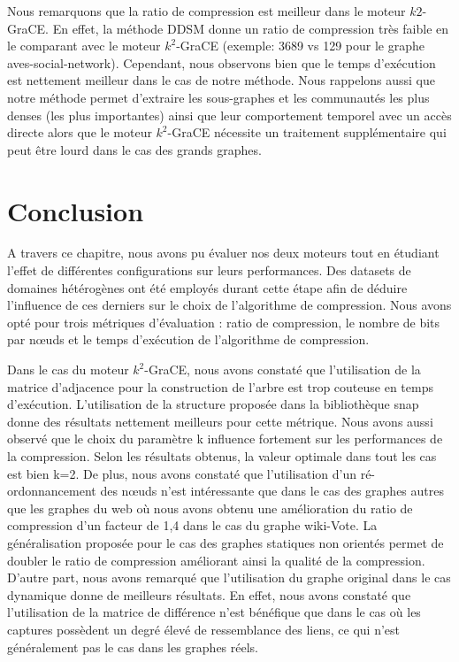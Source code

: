	
	Nous remarquons que la ratio de compression est meilleur dans le moteur $k2$-GraCE. En effet, la méthode DDSM donne un ratio de compression très faible en le comparant avec le moteur $k^2$-GraCE (exemple: 3689 vs 129 pour le graphe aves-social-network). Cependant, nous observons bien que le temps d'exécution est nettement meilleur dans le cas de notre méthode. Nous rappelons aussi que notre méthode permet d'extraire les sous-graphes et les communautés les plus denses (les plus importantes) ainsi que leur comportement temporel avec un accès directe alors que le moteur $k^2$-GraCE nécessite un traitement supplémentaire qui peut être lourd dans le cas des grands graphes. 
	
	 
	
	\section{Conclusion}
	
	A travers ce chapitre,  nous avons pu évaluer nos deux moteurs tout en étudiant l'effet de différentes configurations sur leurs performances. Des datasets de domaines hétérogènes ont été employés durant cette étape afin de déduire l'influence de ces derniers sur le choix de l'algorithme de compression. Nous avons opté pour trois métriques d'évaluation : ratio de compression, le nombre de bits par nœuds et le temps d'exécution de l'algorithme de compression.
	
	Dans le cas du moteur $k^2$-GraCE, nous avons constaté que l'utilisation de la matrice d'adjacence pour la construction de l'arbre est trop couteuse en temps d'exécution. L'utilisation de la structure proposée dans la bibliothèque \gls{snap} donne des résultats nettement meilleurs pour cette métrique. Nous avons aussi observé que le choix du paramètre k influence fortement sur les performances de la compression. Selon les résultats obtenus, la valeur optimale dans tout les cas est bien k=2. De plus, nous avons constaté que l'utilisation d'un ré-ordonnancement des nœuds n'est intéressante que dans le cas des graphes autres que les graphes du web où nous avons obtenu une amélioration du ratio de compression d'un facteur de 1,4 dans le cas du graphe wiki-Vote. La généralisation  proposée pour le cas des graphes statiques non orientés permet de doubler le ratio de compression améliorant ainsi la qualité de la compression. D'autre part, nous avons remarqué que l'utilisation du graphe original dans le cas dynamique donne de meilleurs résultats. En effet, nous avons constaté que l'utilisation de la matrice de différence n'est bénéfique que dans le cas où les captures possèdent un degré élevé de ressemblance des liens, ce qui n'est généralement pas le cas dans les graphes réels.
	
